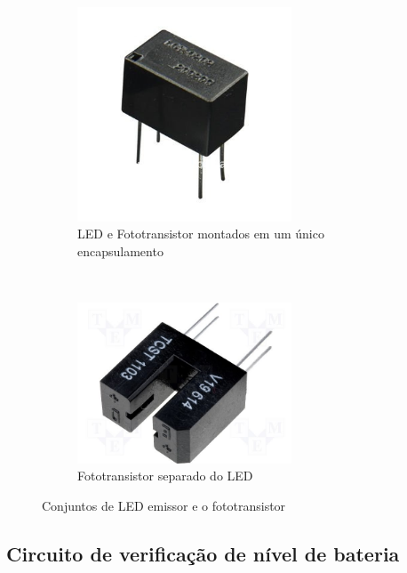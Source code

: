 \begin{figure}
        \centering
        \begin{subfigure}[b]{0.4\textwidth}
                \includegraphics[width=0.7\textwidth]{figuras/optoac.jpg}
                \caption{LED e Fototransistor montados em um único encapsulamento}
                \label{fig:fotoUni}
        \end{subfigure}%
        ~
        \begin{subfigure}[b]{0.4\textwidth}
                \includegraphics[width=0.7\textwidth]{figuras/opto_u.jpg}
                \caption{Fototransistor separado do LED}
                \label{fig:fotoLED}
        \end{subfigure}
        \caption{Conjuntos de LED emissor e o fototransistor}
        \label{fig:LED}
\end{figure}


\subsection{Circuito de verificação de nível de bateria} %
\label{sub:nivelBateria}

